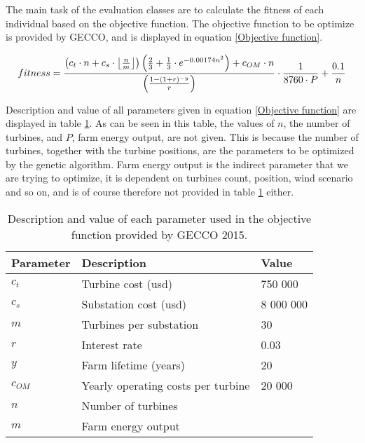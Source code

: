 The main task of the evaluation classes are to calculate the fitness of each individual based on the objective function.  The objective function to be optimize is provided by GECCO, and is displayed in equation \ref{Objective function}.\\

\begin{small}
\begin{equation}
fitness =  \frac{ \left( c_t \cdot n + c_s \cdot \floor*{\frac{n}{m}} \right) \left( \frac{2}{3} + \frac{1}{3} \cdot e^{-0.00174n^2} \right) + c_{OM} \cdot n}{\left( \frac{1 - (1 + r)^{-y}}{r} \right) } \cdot \frac{1}{8760 \cdot P} + \frac{0.1}{n}
\label{Objective function} 
\end{equation}
\end{small}


\noindent Description and value of all parameters given in equation \ref{Objective function} are displayed in table \ref{Parameters}. As can be seen in this table, the values of $n$, the number of turbines, and $P$, farm energy output, are not given. This is because the number of turbines, together with the turbine positions, are the parameters to be optimized by the genetic algorithm. Farm energy output is the indirect parameter that we are trying to optimize, it is dependent on turbines count, position, wind scenario and so on, and is of course therefore not provided in table \ref{Parameters} either.\\


\begin{table}[h!]
\begin{center}
\caption{Description and value of each parameter used in the objective function provided by GECCO 2015.}
\label{Parameters}
\begin{tabular}{l|l|l}
\textbf{Parameter} & \textbf{Description} & \textbf{Value} \\ 
\hline 
$c_t$ & Turbine cost (usd) & 750 000 \\ 
$c_s$ & Substation cost (usd) & 8 000 000 \\ 
$m$ & Turbines per substation & 30 \\ 
$r$ & Interest rate & 0.03 \\ 
$y$ & Farm lifetime (years) & 20 \\ 
$c_{OM}$ & Yearly operating costs per turbine & 20 000 \\ 
$n$ & Number of turbines &  \\ 
$m$ & Farm energy output &  \\  
\end{tabular} 
\end{center}
\end{table}


